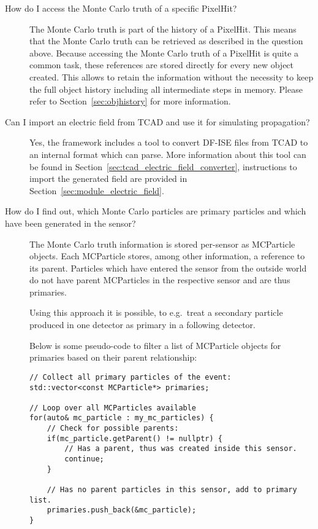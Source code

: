 \begin{description}
\item[How do I access the Monte Carlo truth of a specific PixelHit?]
The Monte Carlo truth is part of the history of a PixelHit.
This means that the Monte Carlo truth can be retrieved as described in the question above.
Because accessing the Monte Carlo truth of a PixelHit is quite a common task, these references are stored directly for every new object created.
This allows to retain the information without the necessity to keep the full object history including all intermediate steps in memory.
Please refer to Section~\ref{sec:objhistory} for more information.
\item[Can I import an electric field from TCAD and use it for simulating propagation?]
Yes, the framework includes a tool to convert DF-ISE files from TCAD to an internal format which \apsq can parse.
More information about this tool can be found in Section~\ref{sec:tcad_electric_field_converter}, instructions to import the generated field are provided in Section~\ref{sec:module_electric_field}.
\item[How do I find out, which Monte Carlo particles are primary particles and which have been generated in the sensor?]
The Monte Carlo truth information is stored per-sensor as MCParticle objects. Each MCParticle stores, among other information, a reference to its parent. Particles which have entered the sensor from the outside world do not have parent MCParticles in the respective sensor and are thus primaries.

Using this approach it is possible, to e.g.\ treat a secondary particle produced in one detector as primary in a following detector.

Below is some pseudo-code to filter a list of MCParticle objects for primaries based on their parent relationship:

\begin{verbatim}
// Collect all primary particles of the event:
std::vector<const MCParticle*> primaries;

// Loop over all MCParticles available
for(auto& mc_particle : my_mc_particles) {
    // Check for possible parents:
    if(mc_particle.getParent() != nullptr) {
        // Has a parent, thus was created inside this sensor.
        continue;
    }

    // Has no parent particles in this sensor, add to primary list.
    primaries.push_back(&mc_particle);
}
\end{verbatim}


\end{description}
